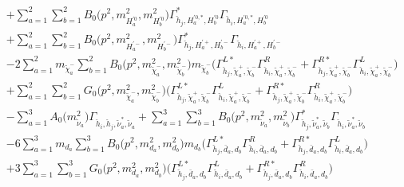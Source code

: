\begin{itemize}
\begin{align}
 &+\sum_{a=1}^{2}\sum_{b=1}^{2}{B_0\Big(p^{2},m^2_{H^{'0}_{{a}}},m^2_{H^{'0}_{{b}}}\Big)} {\Gamma^*_{\check{h}_{{j}},H^{{'0},*}_{{a}},H^{'0}_{{b}}}} {\Gamma_{\check{h}_{{i}},H^{{'0},*}_{{a}},H^{'0}_{{b}}}} \nonumber \\ 
 &+\sum_{a=1}^{2}\sum_{b=1}^{2}{B_0\Big(p^{2},m^2_{H^{'-}_{{a}}},m^2_{H^{'-}_{{b}}}\Big)} {\Gamma^*_{\check{h}_{{j}},H^{'+}_{{a}},H^{'-}_{{b}}}} {\Gamma_{\check{h}_{{i}},H^{'+}_{{a}},H^{'-}_{{b}}}} \nonumber \\ 
 &-2 \sum_{a=1}^{2}m_{\tilde{\chi}^-_{{a}}} \sum_{b=1}^{2}{B_0\Big(p^{2},m^2_{\tilde{\chi}^-_{{a}}},m^2_{\tilde{\chi}^-_{{b}}}\Big)} m_{\tilde{\chi}^-_{{b}}} \Big({\Gamma^{L*}_{\check{h}_{{j}},\tilde{\chi}^+_{{a}},\tilde{\chi}^-_{{b}}}} {\Gamma^R_{\check{h}_{{i}},\tilde{\chi}^+_{{a}},\tilde{\chi}^-_{{b}}}}  + {\Gamma^{R*}_{\check{h}_{{j}},\tilde{\chi}^+_{{a}},\tilde{\chi}^-_{{b}}}} {\Gamma^L_{\check{h}_{{i}},\tilde{\chi}^+_{{a}},\tilde{\chi}^-_{{b}}}} \Big)  \nonumber \\ 
 &+\sum_{a=1}^{2}\sum_{b=1}^{2}{G_0\Big(p^{2},m^2_{\tilde{\chi}^-_{{a}}},m^2_{\tilde{\chi}^-_{{b}}}\Big)} \Big({\Gamma^{L*}_{\check{h}_{{j}},\tilde{\chi}^+_{{a}},\tilde{\chi}^-_{{b}}}} {\Gamma^L_{\check{h}_{{i}},\tilde{\chi}^+_{{a}},\tilde{\chi}^-_{{b}}}}  + {\Gamma^{R*}_{\check{h}_{{j}},\tilde{\chi}^+_{{a}},\tilde{\chi}^-_{{b}}}} {\Gamma^R_{\check{h}_{{i}},\tilde{\chi}^+_{{a}},\tilde{\chi}^-_{{b}}}} \Big)\nonumber \\ 
 &- \sum_{a=1}^{3}{A_0\Big(m^2_{\tilde{\nu}_{{a}}}\Big)} {\Gamma_{\check{h}_{{i}},\check{h}_{{j}},\tilde{\nu}^*_{{a}},\tilde{\nu}_{{a}}}}  +\sum_{a=1}^{3}\sum_{b=1}^{3}{B_0\Big(p^{2},m^2_{\tilde{\nu}_{{a}}},m^2_{\tilde{\nu}_{{b}}}\Big)} {\Gamma^*_{\check{h}_{{j}},\tilde{\nu}^*_{{a}},\tilde{\nu}_{{b}}}} {\Gamma_{\check{h}_{{i}},\tilde{\nu}^*_{{a}},\tilde{\nu}_{{b}}}} \nonumber \\ 
 &-6 \sum_{a=1}^{3}m_{d_{{a}}} \sum_{b=1}^{3}{B_0\Big(p^{2},m^2_{d_{{a}}},m^2_{d_{{b}}}\Big)} m_{d_{{b}}} \Big({\Gamma^{L*}_{\check{h}_{{j}},\bar{d}_{{a}},d_{{b}}}} {\Gamma^R_{\check{h}_{{i}},\bar{d}_{{a}},d_{{b}}}}  + {\Gamma^{R*}_{\check{h}_{{j}},\bar{d}_{{a}},d_{{b}}}} {\Gamma^L_{\check{h}_{{i}},\bar{d}_{{a}},d_{{b}}}} \Big)  \nonumber \\ 
 &+3 \sum_{a=1}^{3}\sum_{b=1}^{3}{G_0\Big(p^{2},m^2_{d_{{a}}},m^2_{d_{{b}}}\Big)} \Big({\Gamma^{L*}_{\check{h}_{{j}},\bar{d}_{{a}},d_{{b}}}} {\Gamma^L_{\check{h}_{{i}},\bar{d}_{{a}},d_{{b}}}}  + {\Gamma^{R*}_{\check{h}_{{j}},\bar{d}_{{a}},d_{{b}}}} {\Gamma^R_{\check{h}_{{i}},\bar{d}_{{a}},d_{{b}}}} \Big) \nonumber \\ 

\end{align}
\end{itemize}
